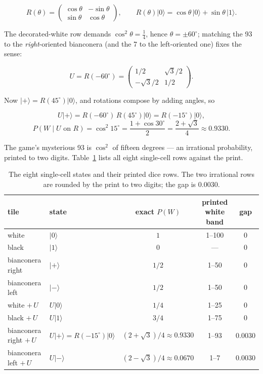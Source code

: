 \documentclass[a4paper,11pt]{article}
\providecommand{\ket}[1]{|#1\rangle}
\begin{document}
\begin{equation}
    R(\theta) = \begin{pmatrix} \cos\theta & -\sin\theta \\ \sin\theta & \cos\theta \end{pmatrix},
    \qquad R(\theta)\ket{0} = \cos\theta\,\ket{0} + \sin\theta\,\ket{1}.
    \label{eq:rot}
\end{equation}

\noindent The decorated-white row demands $\cos^2\theta = \tfrac14$, hence
$\theta = \pm 60^\circ$; matching the 93 to the \emph{right}-oriented bianconera (and
the 7 to the left-oriented one) fixes the sense:

\begin{equation}
    U = R(-60^\circ) = \begin{pmatrix} 1/2 & \sqrt{3}/2 \\ -\sqrt{3}/2 & 1/2 \end{pmatrix}.
    \label{eq:ugate}
\end{equation}

\noindent Now $\ket{+} = R(45^\circ)\ket{0}$, and rotations compose by adding angles, so

\begin{equation}
    U\ket{+} = R(-60^\circ)\,R(45^\circ)\ket{0} = R(-15^\circ)\ket{0},
    \label{eq:u15}
\end{equation}
\begin{equation}
    P(W \mid U \text{ on } R) = \cos^2 15^\circ = \frac{1 + \cos 30^\circ}{2}
    = \frac{2 + \sqrt{3}}{4} \approx 0.9330.
    \label{eq:cos15}
\end{equation}

The game's mysterious 93 is $\cos^2$ of fifteen degrees --- an irrational probability,
printed to two digits. Table~\ref{tab:single} lists all eight single-cell rows against
the print.

\begin{table}[H]
\centering
\small
\begin{tabular}{llccc}
\toprule
tile & state & exact $P(W)$ & printed white band & gap \\
\midrule
white & $\ket{0}$ & $1$ & 1--100 & 0 \\
black & $\ket{1}$ & $0$ & --- & 0 \\
bianconera right & $\ket{+}$ & $1/2$ & 1--50 & 0 \\
bianconera left & $\ket{-}$ & $1/2$ & 1--50 & 0 \\
white $+\,U$ & $U\ket{0}$ & $1/4$ & 1--25 & 0 \\
black $+\,U$ & $U\ket{1}$ & $3/4$ & 1--75 & 0 \\
bianconera right $+\,U$ & $U\ket{+} = R(-15^\circ)\ket{0}$ & $(2+\sqrt 3)/4 \approx 0.9330$ & 1--93 & $0.0030$ \\
bianconera left $+\,U$ & $U\ket{-}$ & $(2-\sqrt 3)/4 \approx 0.0670$ & 1--7 & $0.0030$ \\
\bottomrule
\end{tabular}
\caption{The eight single-cell states and their printed dice rows. The two irrational
rows are rounded by the print to two digits; the gap is $0.0030$.}
\label{tab:single}
\end{table}
\end{document}
